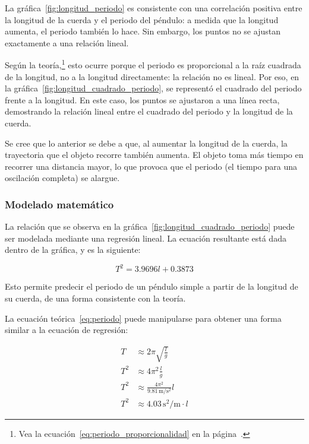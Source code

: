 \documentclass[letterpaper]{report}
\numberwithin{table}{section}
\begin{document}
La gráfica~\ref{fig:longitud_periodo} es consistente con una
correlación positiva entre la longitud de la cuerda y el periodo del
péndulo: a medida que la longitud aumenta, el periodo también lo hace. Sin
embargo, los puntos no se ajustan exactamente a una relación lineal.

Según la teoría,\footnote{Vea la
  ecuación~\eqref{eq:periodo_proporcionalidad} en la
página~\pageref{eq:periodo_proporcionalidad}.} esto ocurre porque el periodo es
proporcional a la raíz cuadrada de la longitud, no a la longitud
directamente: la relación no es lineal. Por eso, en la
gráfica~\ref{fig:longitud_cuadrado_periodo}, se representó el
cuadrado del periodo frente a la longitud. En este caso, los puntos
se ajustaron a una línea recta, demostrando la relación lineal entre
el cuadrado del periodo y la longitud de la cuerda.

Se cree que lo anterior se debe a que, al aumentar la longitud de la cuerda, la
trayectoria que el objeto recorre también aumenta. El objeto toma más
tiempo en recorrer una distancia mayor, lo que provoca que el periodo
(el tiempo para una oscilación completa) se alargue.

\subsubsection{Modelado matemático}

La relación que se observa en la gráfica~\ref{fig:longitud_cuadrado_periodo}
puede ser modelada mediante una regresión lineal. La ecuación resultante está
dada dentro de la gráfica, y es la siguiente:

\begin{equation}
  T^{2} = 3.9696l + 0.3873
\end{equation}

Esto permite predecir el periodo de un péndulo simple a partir de la longitud de
su cuerda, de una forma consistente con la teoría.

La ecuación teórica~\eqref{eq:periodo} puede manipularse para obtener una forma
similar a la ecuación de regresión:

\begin{align*}
  T &\approx 2\pi\sqrt{\frac{l}{g}} \\
  T^{2} &\approx 4\pi^{2}\frac{l}{g} \\
  T^{2} &\approx \frac{4\pi^{2}}{9.81\,\text{m/s$^{2}$}}l \\
  T^{2} &\approx 4.03\,\text{s$^{2}$/m} \cdot l
\end{align*}
\end{document}
